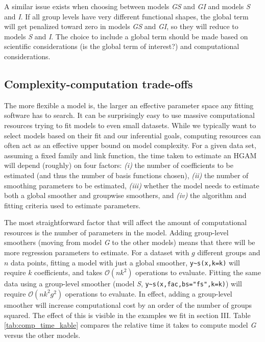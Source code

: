 \documentclass[12pt]{article}
\begin{document}
A similar issue exists when choosing between models \emph{GS} and
\emph{GI} and models \emph{S} and \emph{I}. If all group levels have
very different functional shapes, the global term will get penalized
toward zero in models \emph{GS} and \emph{GI}, so they will reduce to
models \emph{S} and \emph{I}. The choice to include a global term should
be made based on scientific considerations (is the global term of
interest?) and computational considerations.

\subsection{Complexity-computation
trade-offs}\label{complexity-computation-trade-offs}

The more flexible a model is, the larger an effective parameter space
any fitting software has to search. It can be surprisingly easy to use
massive computational resources trying to fit models to even small
datasets. While we typically want to select models based on their fit
and our inferential goals, computing resources can often act as an
effective upper bound on model complexity. For a given data set,
assuming a fixed family and link function, the time taken to estimate an
HGAM will depend (roughly) on four factors: \emph{(i)} the number of
coefficients to be estimated (and thus the number of basis functions
chosen), \emph{(ii)} the number of smoothing parameters to be estimated,
\emph{(iii)} whether the model needs to estimate both a global smoother
and groupwise smoothers, and \emph{(iv)} the algorithm and fitting
criteria used to estimate parameters.

The most straightforward factor that will affect the amount of
computational resources is the number of parameters in the model. Adding
group-level smoothers (moving from model \emph{G} to the other models)
means that there will be more regression parameters to estimate. For a
dataset with \(g\) different groups and \(n\) data points, fitting a
model with just a global smoother, \texttt{y\textasciitilde{}s(x,k=k)}
will require \(k\) coefficients, and takes \(\mathcal{O}(nk^2)\)
operations to evaluate. Fitting the same data using a group-level
smoother (model \emph{S},
\texttt{y\textasciitilde{}s(x,fac,bs="fs",k=k)}) will require
\(\mathcal{O}(nk^2g^2)\) operations to evaluate. In effect, adding a
group-level smoother will increase computational cost by an order of the
number of groups squared. The effect of this is visible in the examples
we fit in section III. Table \ref{tab:comp_time_kable} compares the
relative time it takes to compute model \emph{G} versus the other
models.
\end{document}
